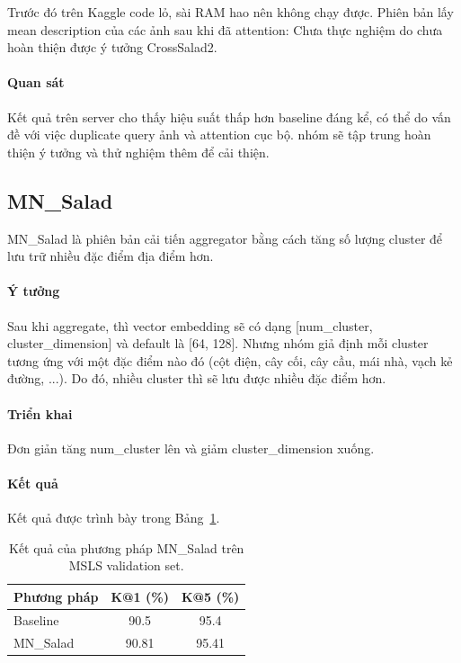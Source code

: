 Trước đó trên Kaggle code lỏ, sài RAM hao nên không chạy được. Phiên bản lấy mean description của các ảnh sau khi đã attention: Chưa thực nghiệm do chưa hoàn thiện được ý tưởng CrossSalad2.

\paragraph{Quan sát}
Kết quả trên server cho thấy hiệu suất thấp hơn baseline đáng kể, có thể do vấn đề với việc duplicate query ảnh và attention cục bộ. nhóm sẽ tập trung hoàn thiện ý tưởng và thử nghiệm thêm để cải thiện.

\subsection{MN\_Salad}
MN\_Salad là phiên bản cải tiến aggregator bằng cách tăng số lượng cluster để lưu trữ nhiều đặc điểm địa điểm hơn.

\paragraph{Ý tưởng}
Sau khi aggregate, thì vector embedding sẽ có dạng [num\_cluster, cluster\_dimension] và default là [64, 128]. Nhưng nhóm giả định mỗi cluster tương ứng với một đặc điểm nào đó (cột điện, cây cối, cây cầu, mái nhà, vạch kẻ đường, ...). Do đó, nhiều cluster thì sẽ lưu được nhiều đặc điểm hơn.

\paragraph{Triển khai}
Đơn giản tăng num\_cluster lên và giảm cluster\_dimension xuống.

\paragraph{Kết quả}
Kết quả được trình bày trong Bảng~\ref{tab:mnsalad_results}.

\begin{table}[t]
\centering
\caption{Kết quả của phương pháp MN\_Salad trên MSLS validation set.}
\label{tab:mnsalad_results}
\small
\begin{tabular}{@{}lcc@{}}
\toprule
\textbf{Phương pháp} & \textbf{K@1 (\%)} & \textbf{K@5 (\%)} \\
\midrule
Baseline & 90.5 & 95.4 \\
MN\_Salad & 90.81 & 95.41 \\
\bottomrule
\end{tabular}
\end{table}

